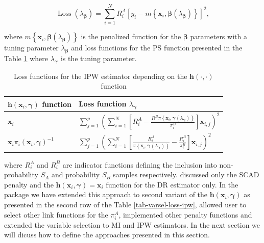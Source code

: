 \documentclass[
]{jss}
\begin{document}
\begin{equation}  
\operatorname{Loss}\left(\lambda_{\boldsymbol{\beta}}\right)=\sum_{i=1}^N R_i^A\left[y_i-m\left\{\boldsymbol{x}_i, \boldsymbol{\beta}(\lambda_{\boldsymbol{\beta}})\right\}\right]^2,
\label{eq-varsel-loss-mi}
\end{equation}

where
\(m\left\{\boldsymbol{x}_i, \boldsymbol{\beta}(\lambda_{\boldsymbol{\beta}})\right\}\)
is the penalized function for the \(\boldsymbol{\beta}\) parameters with
a tuning parameter \(\lambda_{\boldsymbol{\beta}}\) and loss functions
for the PS function presented in the Table \ref{tab-varsel-loss-ipw}
where \(\lambda_{\boldsymbol{\gamma}}\) is the tuning parameter.

\begin{table}[ht!]
\centering
\begin{tabular}{ll}
\hline
$\boldsymbol{h}(\boldsymbol{x}_i, \boldsymbol{\gamma})$ function &  Loss function $\lambda_{\boldsymbol{\gamma}}$ \\
\hline
$\boldsymbol{x}_i$ & $\sum_{j=1}^p\left(\sum_{i=1}^N\left[R_i^A - \frac{R^B\pi\left\{\boldsymbol{x}_i, \boldsymbol{\gamma}(\lambda_{\boldsymbol{\gamma}})\right\}}{\pi_i^B}\right] \boldsymbol{x}_{i, j}\right)^2$\\
\hline
$\boldsymbol{x}_i \pi_i(\boldsymbol{x}_i, \boldsymbol{\gamma})^{-1}$ & $\sum_{j=1}^p\left(\sum_{i=1}^N\left[\frac{R_i^A}{\pi\left\{\boldsymbol{x}_i, \boldsymbol{\gamma}(\lambda_{\boldsymbol{\gamma}})\right\}}-\frac{R_i^B}{\pi_i^B}\right] \boldsymbol{x}_{i, j}\right)^2$ \\
\hline
\end{tabular}
\caption{Loss functions for the IPW estimator depending on the $\boldsymbol{h}(\cdot,\cdot)$ function}
\label{tab-varsel-loss-ipw}
\end{table}

where \(R_i^A\) and \(R_i^B\) are indicator functions defining the
inclusion into non-probability \(S_A\) and probability \(S_B\) samples
respectively. \citet{yang_doubly_2020} discussed only the SCAD penalty
and the
\(\boldsymbol{h}(\boldsymbol{x}_i, \boldsymbol{\gamma})=\boldsymbol{x}_i\)
function for the DR estimator only. In the  package we
have extended this approach to second variant of the
\(\boldsymbol{h}(\boldsymbol{x}_i, \boldsymbol{\gamma})\) as presented
in the second row of the Table \eqref{tab-varsel-loss-ipw}, allowed user
to select other link functions for the \(\pi_i^A\), implemented other
penalty functions and extended the variable selection to MI and IPW
estimators. In the next section we will dicuss how to define the
approaches presented in this section.
\end{document}
